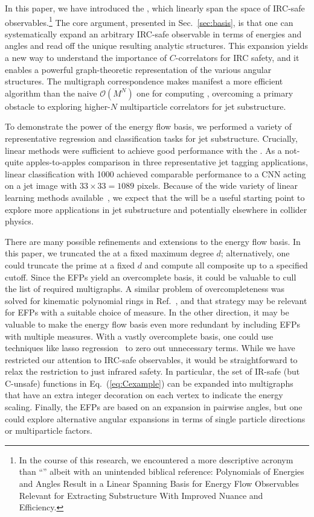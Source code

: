 \documentclass[letterpaper,11pt]{article}
\DeclareRobustCommand{\Sec}[1]{Sec.~\ref{#1}}
\DeclareRobustCommand{\Eq}[1]{Eq.~(\ref{#1})}
\DeclareRobustCommand{\Ref}[1]{Ref.~\cite{#1}}
\newcommand{\Bs}{\text{EFPs}\xspace}
\begin{document}
In this paper, we have introduced the \Bs, which linearly span the space of IRC-safe observables.\footnote{In the course of this research, we encountered a more descriptive acronym than ``\Bs'' albeit with an unintended biblical reference:  Polynomials of Energies and Angles Result in a Linear Spanning Basis for Energy Flow Observables Relevant for Extracting Substructure With Improved Nuance and Efficiency.}
%
The core argument, presented in \Sec{sec:basis}, is that one can systematically expand an arbitrary IRC-safe observable in terms of energies and angles and read off the unique resulting analytic structures.
%
This expansion yields a new way to understand the importance of $C$-correlators \cite{Tkachov:1995kk,Sveshnikov:1995vi,Cherzor:1997ak,Tkachov:1999py} for IRC safety, and it enables a powerful graph-theoretic representation of the various angular structures.
%
The multigraph correspondence makes manifest a more efficient algorithm than the naive $\mathcal O(M^N)$ one for computing \Bs, overcoming a primary obstacle to exploring higher-$N$ multiparticle correlators for jet substructure.

To demonstrate the power of the energy flow basis, we performed a variety of representative regression and classification tasks for jet substructure.
%
Crucially, linear methods were sufficient to achieve good performance with the \Bs.
%
As a not-quite apples-to-apples comparison in three representative jet tagging applications, linear classification with 1000 \Bs achieved comparable performance to a CNN acting on a jet image with $33 \times 33 = 1089$ pixels.
%
Because of the wide variety of linear learning methods available~\cite{bishop2006pattern}, we expect that the \Bs will be a useful starting point to explore more  applications in jet substructure and potentially elsewhere in collider physics.

There are many possible refinements and extensions to the energy flow basis.
%
In this paper, we truncated the \Bs at a fixed maximum degree $d$; alternatively, one could truncate the prime \Bs at a fixed $d$ and compute all composite \Bs up to a specified cutoff.
%
Since the EFPs yield an overcomplete basis, it could be valuable to cull the list of required multigraphs.
%
A similar problem of overcompleteness was solved for kinematic polynomial rings in \Ref{Henning:2017fpj}, and that strategy may be relevant for EFPs with a suitable choice of measure.
%
In the other direction, it may be valuable to make the energy flow basis even more redundant by including EFPs with multiple measures.
%
With a vastly overcomplete basis, one could use techniques like lasso regression~\cite{tibshirani1996regression} to zero out unnecessary terms.
%
While we have restricted our attention to IRC-safe observables, it would be straightforward to relax the restriction to just infrared safety.
%
In particular, the set of IR-safe (but C-unsafe) functions in \Eq{eq:Cexample} can be expanded into multigraphs that have an extra integer decoration on each vertex to indicate the energy scaling.
%
Finally, the EFPs are based on an expansion in pairwise angles, but one could explore alternative angular expansions in terms of single particle directions or multiparticle factors.
\end{document}
